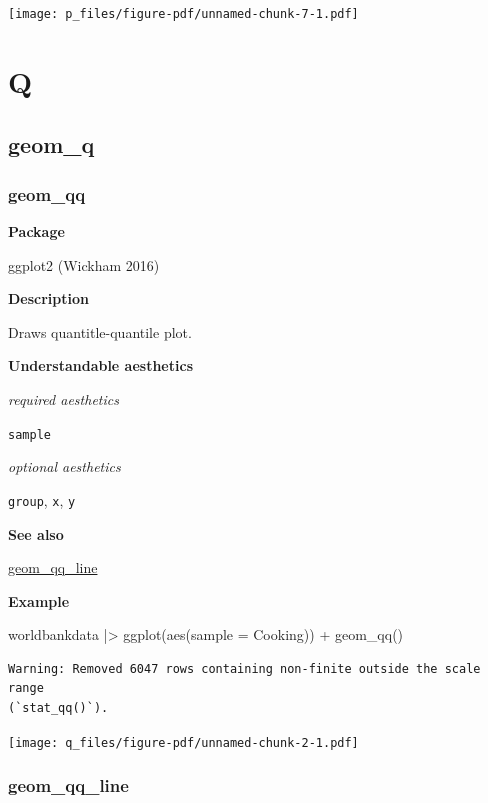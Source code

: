 \documentclass[
  letterpaper,
  DIV=11,
  numbers=noendperiod]{scrreprt}
\newenvironment{Shaded}{\begin{snugshade}}{\end{snugshade}}
\newcommand{\AttributeTok}[1]{\textcolor[rgb]{0.40,0.45,0.13}{#1}}
\newcommand{\FunctionTok}[1]{\textcolor[rgb]{0.28,0.35,0.67}{#1}}
\newcommand{\NormalTok}[1]{\textcolor[rgb]{0.00,0.23,0.31}{#1}}
\newcommand{\SpecialCharTok}[1]{\textcolor[rgb]{0.37,0.37,0.37}{#1}}
\begin{document}
\texttt{[image: p\_files/figure-pdf/unnamed-chunk-7-1.pdf]}

\part{Q}

\chapter{geom\_q}\label{sec-q}

\section{geom\_qq}\label{qq}

\textbf{Package}

ggplot2 (Wickham 2016)

\textbf{Description}

Draws quantitle-quantile plot.

\textbf{Understandable aesthetics}

\emph{required aesthetics}

\texttt{sample}

\emph{optional aesthetics}

\texttt{group}, \texttt{x}, \texttt{y}

\textbf{See also}

\hyperref[qq_line]{geom\_qq\_line}

\textbf{Example}

\begin{Shaded}
\begin{Highlighting}[]
\NormalTok{worldbankdata }\SpecialCharTok{|\textgreater{}}
  \FunctionTok{ggplot}\NormalTok{(}\FunctionTok{aes}\NormalTok{(}\AttributeTok{sample =}\NormalTok{ Cooking)) }\SpecialCharTok{+}
  \FunctionTok{geom\_qq}\NormalTok{()}
\end{Highlighting}
\end{Shaded}

\begin{verbatim}
Warning: Removed 6047 rows containing non-finite outside the scale range
(`stat_qq()`).
\end{verbatim}

\texttt{[image: q\_files/figure-pdf/unnamed-chunk-2-1.pdf]}

\section{geom\_qq\_line}\label{qq_line}
\end{document}
